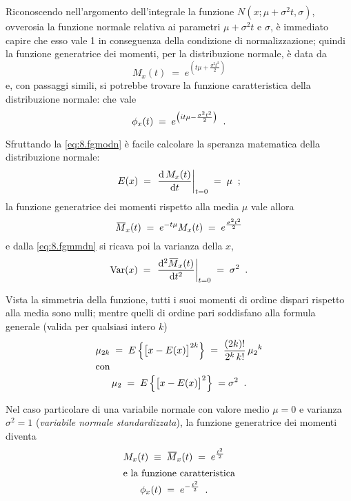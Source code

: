 Riconoscendo nell'argomento dell'integrale la funzione
$N(x;\mu+\sigma^2 t,\sigma)$, ovverosia la funzione normale
relativa ai parametri $\mu + \sigma^2 t$ e $\sigma$, \`e
immediato capire che esso vale 1 in conseguenza della
condizione di normalizzazione; quindi la funzione
generatrice dei momenti, per la distribuzione normale, \`e
data da
\begin{equation} \label{eq:8.fgmodn}
  M_x(t) \; = \; e^{\left( t \mu + \frac{\sigma^2
    t^2}{2} \right)}
\end{equation}
e, con passaggi simili, si potrebbe trovare la funzione
caratteristica della distribuzione normale: che vale
\begin{equation} \label{eq:8.fucadn}
  \phi_x(t) \; = \; e^{\left( i t \mu - \frac{\sigma^2
    t^2}{2} \right)} \;\; .
\end{equation}

Sfruttando la \eqref{eq:8.fgmodn} \`e facile calcolare la
speranza matematica della distribuzione normale:
\begin{equation*}
  E(x) \; = \; \left. \frac{\mathrm{d} \, M_x(t)}{\mathrm{d} t}
    \right|_{t=0} \; = \; \mu \;\; ;
\end{equation*}
la funzione generatrice dei momenti rispetto alla media
$\mu$ vale allora
\begin{equation} \label{eq:8.fgmmdn}
  \ob{M}_x (t) \; = \; e^{- t \mu} M_x(t) \; = \;
    e^{ \frac{\sigma^2 t^2}{2} }
\end{equation}
e dalla \eqref{eq:8.fgmmdn} si ricava poi la varianza
della $x$,
\begin{equation*}
  \var(x) \; = \; \left. \frac{\de^2 \ob{M}_x
    (t)}{\de t^2} \right|_{t=0} \; = \; \sigma^2 \peq .
\end{equation*}

Vista la simmetria della funzione, tutti i suoi momenti di
ordine dispari rispetto alla media sono nulli; mentre quelli
di ordine pari soddisfano alla formula generale (valida per
qualsiasi intero $k$)
\begin{gather}
  \mu_{2k} \; = \; E \left\{ \bigl[ x - E(x)
    \bigr]^{2k} \right\} \; = \; \frac{(2k)!}{2^k \,
    k!} \, {\mu_2} ^k \label{eq:8.mopaga} \\
  \intertext{con}
  \mu_2 \; = \; E \left\{ \bigl[ x - E(x) \bigr]^2
    \right\} \; = \sigma^2 \;\; . \notag
\end{gather}

Nel caso particolare di una variabile normale con valore
medio $\mu=0$ e varianza $\sigma^2=1$ (\emph{variabile
  normale standardizzata}), la funzione generatrice dei
momenti diventa
\begin{gather*}
  M_x(t) \; \equiv \;  \ob{M}_x(t) \; = \;
    e^{\frac{t^2}{2}} \\
  \intertext{e la funzione caratteristica}
  \phi_x(t) \; = \; e^{- \frac{t^2}{2}} \peq .
\end{gather*}

